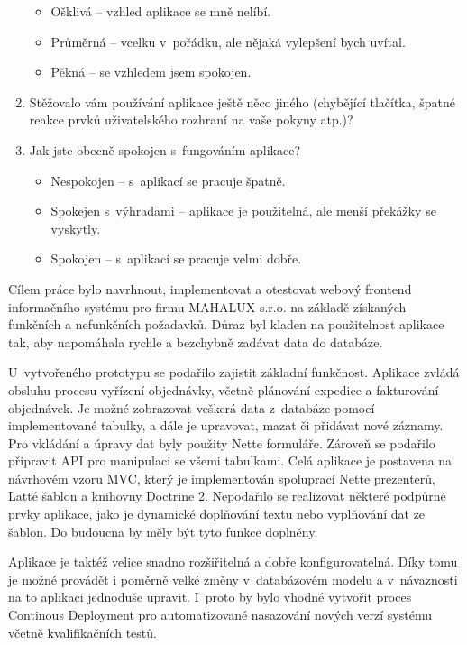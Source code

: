 \documentclass[thesis=B,czech]{FITthesis}[2012/06/26]
\begin{document}
\begin{enumerate}
		\begin{itemize}
			\item Ošklivá -- vzhled aplikace se mně nelíbí.
			\item Průměrná -- vcelku v~pořádku, ale nějaká vylepšení bych uvítal.
			\item Pěkná -- se vzhledem jsem spokojen.
		\end{itemize}
		\item Stěžovalo vám používání aplikace ještě něco jiného (chybějící tlačítka, špatné reakce prvků uživatelského rozhraní na vaše pokyny atp.)?
		\item Jak jste obecně spokojen s~fungováním aplikace?
		\begin{itemize}
			\item Nespokojen -- s~aplikací se pracuje špatně.
			\item Spokejen s~výhradami -- aplikace je použitelná, ale menší překážky se vyskytly.
			\item Spokojen -- s~aplikací se pracuje velmi dobře.
		\end{itemize}
	\end{enumerate}



\begin{conclusion}
	Cílem práce bylo navrhnout, implementovat a otestovat webový frontend informačního systému pro firmu MAHALUX s.r.o. na základě získaných funkčních a nefunkčních požadavků. Důraz byl kladen na použitelnost aplikace tak, aby napomáhala rychle a bezchybně zadávat data do databáze.
	
	U~vytvořeného prototypu se podařilo zajistit základní funkčnost. Aplikace zvládá obsluhu procesu vyřízení objednávky, včetně plánování expedice a fakturování objednávek. Je možné zobrazovat veškerá data z~databáze pomocí implementované tabulky, a dále je upravovat, mazat či přidávat nové záznamy. Pro vkládání a úpravy dat byly použity Nette formuláře. Zároveň se podařilo připravit API pro manipulaci se všemi tabulkami. Celá aplikace je postavena na návrhovém vzoru MVC, který je implementován spoluprací Nette prezenterů, Latté šablon a knihovny Doctrine 2. Nepodařilo se realizovat některé podpůrné prvky aplikace, jako je dynamické doplňování textu nebo vyplňování dat ze šablon. Do budoucna by měly být tyto funkce doplněny. 
	
	Aplikace je taktéž velice snadno rozšiřitelná a dobře konfigurovatelná. Díky tomu je možné provádět i poměrně velké změny v~databázovém modelu a v~návaznosti na to aplikaci jednoduše upravit. I~proto by bylo vhodné vytvořit proces Continous Deployment pro automatizované nasazování nových verzí systému včetně kvalifikačních testů.
\end{conclusion}
\end{document}
